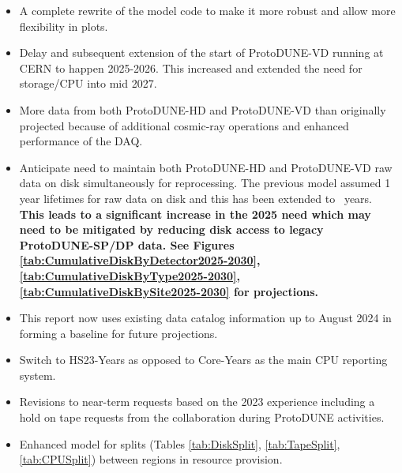 \documentclass[12pt]{article}
\begin{document}
\begin{itemize}
\item A complete rewrite of the model code to make it more robust and allow more flexibility in plots. 
\item Delay and subsequent extension of the start of ProtoDUNE-VD running at CERN to happen 2025-2026. This increased and extended the need for storage/CPU into mid 2027.  
\item More data from both ProtoDUNE-HD and ProtoDUNE-VD than originally projected because of additional cosmic-ray operations and enhanced performance of the DAQ.
\item Anticipate need to maintain both ProtoDUNE-HD and ProtoDUNE-VD raw data on disk simultaneously  for reprocessing.  The previous model assumed 1 year lifetimes for raw data on disk and this has been extended to \configRawDataDiskLifetimes\ years.  {\bf This leads to a significant increase in the 2025 need which may need to be mitigated by reducing disk access to legacy ProtoDUNE-SP/DP data.
See Figures  \ref{tab:CumulativeDiskByDetector2025-2030}, \ref{tab:CumulativeDiskByType2025-2030}, \ref{tab:CumulativeDiskBySite2025-2030} for projections.  }
\item This report now uses existing data catalog information up to August 2024 in forming a baseline for future projections. 
\item Switch to HS23-Years as opposed to Core-Years as the main CPU reporting system.
\item Revisions to near-term requests based on the 2023 experience including a hold on tape requests from the collaboration during ProtoDUNE activities. 
\item Enhanced model for splits (Tables \ref{tab:DiskSplit}, \ref{tab:TapeSplit}, \ref{tab:CPUSplit}) between regions in resource provision. 
\end{itemize}
\end{document}
